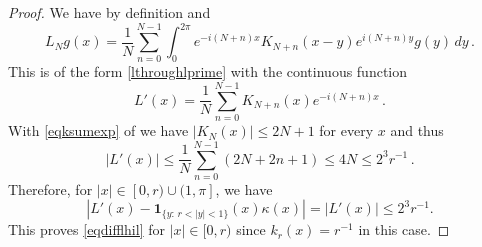 \begin{proof}
\leanok
We have by definition and 
\begin{equation}
    L_Ng(x)=
    \frac 1N\sum_{n=0}^{N-1}
       \int_0^{2\pi} e^{-i(N+n)x} K_{N+n}(x-y) e^{i(N+n)y}g(y)
\, dy \, .\end{equation}
This is of the form \eqref{lthroughlprime} with
the continuous function
\begin{equation}
    {L'}(x)= \frac 1N\sum_{n=0}^{N-1}
      K_{N+n}(x) e^{-i(N+n)x}\, .
\end{equation}
With \eqref{eqksumexp} of 
we have $|K_N(x)|\le 2N+1$ for every $x$ and thus
\begin{equation}\label{eqhil13}
    |{L'}(x)|\le \frac 1N\sum_{n=0}^{N-1}
      (2N+2n+1) \le 4N\le 2^3 r^{-1}\, .
\end{equation}
Therefore, for $|x|\in [0, r)\cup (1, \pi]$, we have
\begin{equation}
    \label{eqdiffzero}
    \left|L'(x)-\mathbf{1}_{\{y:\, r<|y|<1\}}(x)\kappa(x)\right|=|L'(x)|\leq 2^{3} r^{-1}.
\end{equation}
This proves \eqref{eqdifflhil} for $|x|\in [0, r)$ since $k_r(x)=r^{-1}$ in this case.


\end{proof}
